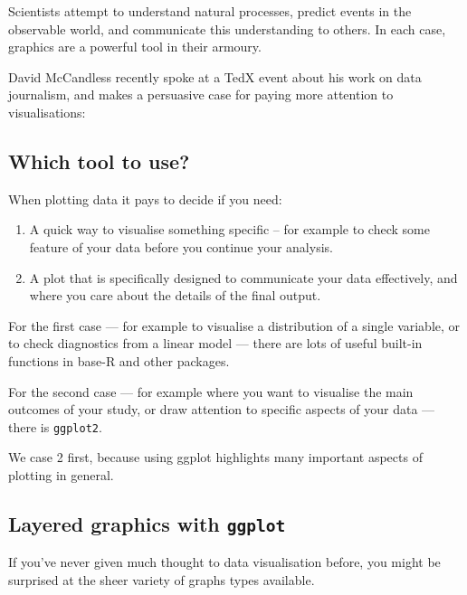 \documentclass[]{article}
\begin{document}
Scientists attempt to understand natural processes, predict events in the
observable world, and communicate this understanding to others. In each case,
graphics are a powerful tool in their armoury.

David McCandless recently spoke at a TedX event about his work on data
journalism, and makes a persuasive case for paying more attention to
visualisations:

\hypertarget{graphics-approaches}{%
\subsection*{Which tool to use?}\label{graphics-approaches}}

When plotting data it pays to decide if you need:

\begin{enumerate}
\def\labelenumi{\arabic{enumi}.}
\item
  A quick way to visualise something specific -- for example to check some
  feature of your data before you continue your analysis.
\item
  A plot that is specifically designed to communicate your data effectively,
  and where you care about the details of the final output.
\end{enumerate}

For the first case --- for example to visualise a distribution of a single
variable, or to check diagnostics from a linear model --- there are lots of
useful built-in functions in base-R and other packages.

For the second case --- for example where you want to visualise the main
outcomes of your study, or draw attention to specific aspects of your data ---
there is \texttt{ggplot2}.

We case 2 first, because using ggplot highlights many important aspects of
plotting in general.

\hypertarget{layered-graphics}{%
\subsection*{\texorpdfstring{Layered graphics with \texttt{ggplot}}{Layered graphics with ggplot}}\label{layered-graphics}}

If you've never given much thought to data visualisation before, you might be
surprised at the sheer variety of graphs types available.
\end{document}
